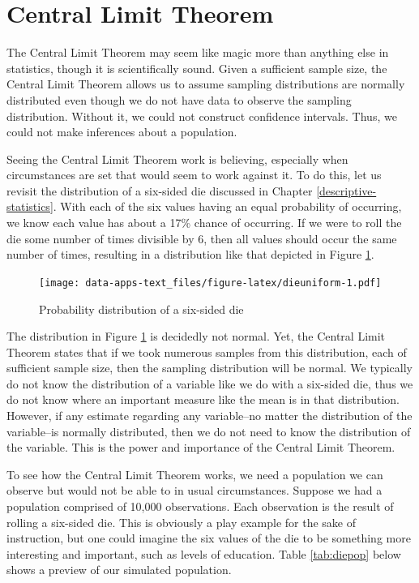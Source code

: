 \documentclass[
]{book}
\begin{document}
\hypertarget{central-limit-theorem}{%
\section{Central Limit Theorem}\label{central-limit-theorem}}

The Central Limit Theorem may seem like magic more than anything else in statistics, though it is scientifically sound. Given a sufficient sample size, the Central Limit Theorem allows us to assume sampling distributions are normally distributed even though we do not have data to observe the sampling distribution. Without it, we could not construct confidence intervals. Thus, we could not make inferences about a population.

Seeing the Central Limit Theorem work is believing, especially when circumstances are set that would seem to work against it. To do this, let us revisit the distribution of a six-sided die discussed in Chapter \ref{descriptive-statistics}. With each of the six values having an equal probability of occurring, we know each value has about a 17\% chance of occurring. If we were to roll the die some number of times divisible by 6, then all values should occur the same number of times, resulting in a distribution like that depicted in Figure \ref{fig:dieuniform}.

\begin{figure}
\centering
\texttt{[image: data-apps-text\_files/figure-latex/dieuniform-1.pdf]}
\caption{\label{fig:dieuniform}Probability distribution of a six-sided die}
\end{figure}

The distribution in Figure \ref{fig:dieuniform} is decidedly not normal. Yet, the Central Limit Theorem states that if we took numerous samples from this distribution, each of sufficient sample size, then the sampling distribution will be normal. We typically do not know the distribution of a variable like we do with a six-sided die, thus we do not know where an important measure like the mean is in that distribution. However, if any estimate regarding any variable--no matter the distribution of the variable--is normally distributed, then we do not need to know the distribution of the variable. This is the power and importance of the Central Limit Theorem.

To see how the Central Limit Theorem works, we need a population we can observe but would not be able to in usual circumstances. Suppose we had a population comprised of 10,000 observations. Each observation is the result of rolling a six-sided die. This is obviously a play example for the sake of instruction, but one could imagine the six values of the die to be something more interesting and important, such as levels of education. Table \ref{tab:diepop} below shows a preview of our simulated population.
\end{document}
